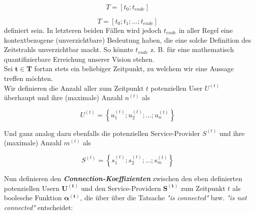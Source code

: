 \documentclass[11pt]{scrartcl}
\begin{document}
\begin{equation*}
  T = [t_0; t_{ende}]
\end{equation*}

\begin{equation*}
  T = [t_0; t_1;...; t_{ende}]
\end{equation*}
definiert sein. In letzteren beiden Fällen wird jedoch $t_{ende}$ in aller Regel eine kontextbezogene (unverzichtbare) Bedeutung haben, die eine solche Definition des Zeitstrahls unverzichtbar macht. So könnte $t_{ende}$ z. B. für eine mathematisch quantifizierbare Erreichung unserer Vision stehen. \\

Sei $\mathbf{t \in T}$ fortan stets ein beliebiger Zeitpunkt, zu welchem wir eine Aussage treffen möchten. \\


Wir definieren die Anzahl aller zum Zeitpunkt $t$ potenziellen User $U^{(t)}$ überhaupt und ihre (maximale) Anzahl $n^{(t)}$ als \\

\begin{Def}\label{def:Def1}
\begin{equation*}
  U^{(t)} = \left\{ u^{(t)}_1; u^{(t)}_2;...; u^{(t)}_{n} \right\}
\end{equation*}
\end{Def} 

\vspace{0.3cm}


Und ganz analog dazu ebenfalls die potenziellen Service-Provider $S^{(t)}$ und ihre (maximale) Anzahl $m^{(t)}$ als \\

\begin{Def}\label{def:Def2}
\begin{equation*}
  S^{(t)} = \left\{ s^{(t)}_1; s^{(t)}_2;...; s^{(t)}_{m}\right\}
\end{equation*}
\end{Def}

\vspace{1cm}


Nun definieren den \textbf{\textit{Connection-Koeffizienten}} zwischen den eben definierten potenziellen Usern $\mathbf{U^{(t)}}$ und den Service-Providern $\mathbf{S^{(t)}}$ zum Zeitpunkt $t$ als boolesche Funktion $\mathbf{\alpha^{(t)}}$, die über über die Tatsache \textit{"is connected"} bzw. \textit{"is not connected"} entscheidet: \\
\end{document}
